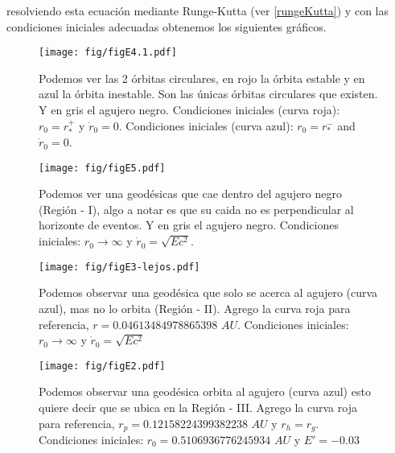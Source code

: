 \documentclass[../Main.tex]{subfiles}
\begin{document}
resolviendo esta ecuación mediante Runge-Kutta (ver \ref{rungeKutta}) y con las condiciones iniciales adecuadas obtenemos los siguientes gráficos. 

\begin{figure}[H]
    \centering
    \texttt{[image: fig/figE4.1.pdf]}
    \caption{Podemos ver las 2 órbitas circulares, en rojo la órbita estable y en azul la órbita inestable. Son las únicas órbitas circulares que existen. Y en gris el agujero negro. Condiciones iniciales (curva roja): $r_0=r_{*}^+$ y $\dot{r}_0=0$. Condiciones iniciales (curva azul):  $r_0=r_{*}^-$ and $\dot{r}_0=0$. }
    \label{timelike:circular}
\end{figure}
\begin{figure}[H]
    \centering
    \texttt{[image: fig/figE5.pdf]}
    \caption{Podemos ver una geodésicas que cae dentro del agujero negro (Región - I), algo a notar es que su caida no es perpendicular al horizonte de eventos. Y en gris el agujero negro. Condiciones iniciales: $r_0\rightarrow\infty$ y $\dot{r}_0=\sqrt{Ec^2}$.}
    \label{timelike:caida}
\end{figure}

\newpage

\begin{figure}[H]
    \centering
    \texttt{[image: fig/figE3-lejos.pdf]}
    \caption{Podemos observar una geodésica que solo se acerca al agujero (curva azul), mas no lo orbita (Región - II). Agrego la curva roja para referencia, $r=0.04613484978865398\,\,AU$. Condiciones iniciales: $r_0\rightarrow\infty$ y $\dot{r}_0=\sqrt{Ec^2}$}
    \label{timelike:acerca}
\end{figure}

\begin{figure}[H]
    \centering
    \texttt{[image: fig/figE2.pdf]}
    \caption{Podemos observar una geodésica orbita al agujero (curva azul) esto quiere decir que se ubica en la Región - III. Agrego la curva roja para referencia, $r_{p}=0.12158224399382238\,\,AU$ y $r_{h} = r_{g}$. Condiciones iniciales: $r_0=0.5106936776245934\,\,AU$ y $E'=-0.03$}
\end{figure}
\end{document}
